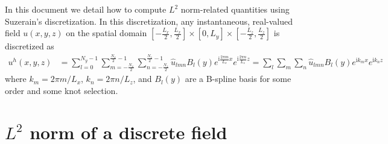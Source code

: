 \documentclass[letterpaper,11pt,nointlimits,reqno]{amsart}
\newcommand{\ii}{\ensuremath{\mathrm{i}}}
\begin{document}
In this document we detail how to compute $L^2$ norm-related quantities using
Suzerain's discretization.  In this discretization, any instantaneous,
real-valued field $u\!\left(x,y,z\right)$ on the spatial domain
$\left[-\frac{L_x}{2},\frac{L_x}{2}\right] \times{} [0,L_y] \times{}
\left[-\frac{L_z}{2},\frac{L_z}{2}\right]$ is discretized as
\begin{align}
  u^h(x,y,z)
&=
  \sum_{l=0}^{N_y - 1}
  \sum_{m=-\frac{N_x}{2}}^{\frac{N_x}{2}-1}
  \sum_{n=-\frac{N_z}{2}}^{\frac{N_z}{2}-1}
  \hat{u}_{l m n}
  B_l\!\left(y\right)
  e^{\ii\frac{2\pi{}m}{L_x}x}
  e^{\ii\frac{2\pi{}n}{L_z}z}
=
  \sum_{l}\sum_{m}\sum_{n}
  \hat{u}_{l m n}B_l\!\left(y\right)e^{\ii k_m x}e^{\ii k_n z}
\end{align}
where $k_m = 2\pi{}m/L_x$, $k_n = 2\pi{}n/L_z$, and $B_l\!\left(y\right)$ are a
B-spline basis for some order and some knot selection.

\section{$L^2$ norm of a discrete field}
\end{document}
